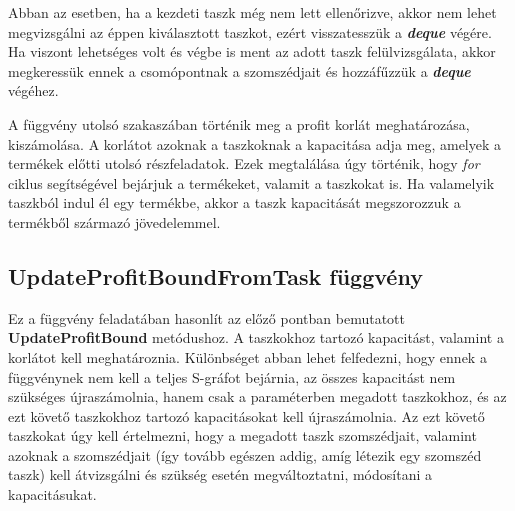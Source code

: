Abban az esetben, ha a kezdeti taszk még nem lett ellenőrizve, akkor nem lehet megvizsgálni az éppen kiválasztott taszkot, ezért visszatesszük a \textbf{\textit{deque}} végére.
Ha viszont lehetséges volt és végbe is ment az adott taszk felülvizsgálata, akkor megkeressük ennek a csomópontnak a szomszédjait és hozzáfűzzük a \textbf{\textit{deque}} végéhez.

A függvény utolsó szakaszában történik meg a profit korlát meghatározása, kiszámolása.
A korlátot azoknak a taszkoknak a kapacitása adja meg, amelyek a termékek előtti utolsó részfeladatok.
Ezek megtalálása úgy történik, hogy \textit{for} ciklus segítségével bejárjuk a termékeket, valamit a taszkokat is.
Ha valamelyik taszkból indul él egy termékbe, akkor a taszk kapacitását megszorozzuk a termékből származó jövedelemmel.

\subsection{UpdateProfitBoundFromTask függvény}
Ez a függvény feladatában hasonlít az előző pontban bemutatott \textbf{UpdateProfitBound} metódushoz.
A taszkokhoz tartozó kapacitást, valamint a korlátot kell meghatároznia.
Különbséget abban lehet felfedezni, hogy ennek a függvénynek nem kell a teljes S-gráfot bejárnia, az összes kapacitást nem szükséges újraszámolnia, hanem csak a paraméterben megadott taszkokhoz, és az ezt követő taszkokhoz tartozó kapacitásokat kell újraszámolnia.
Az ezt követő taszkokat úgy kell értelmezni, hogy a megadott taszk szomszédjait, valamint azoknak a szomszédjait (így tovább egészen addig, amíg létezik egy szomszéd taszk) kell átvizsgálni és szükség esetén megváltoztatni, módosítani a kapacitásukat.

